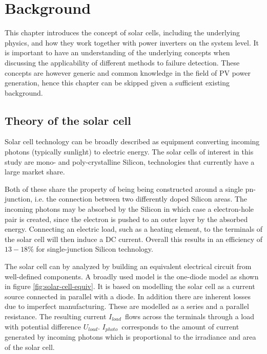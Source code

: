 \chapter{Background}
This chapter introduces the concept of solar cells, including the underlying physics,
and how they work together with power inverters on the system level.
It is important to have an understanding of the underlying concepts when discussing the applicability of different methods to failure detection.
These concepts are however generic and common knowledge in the field of PV power generation, 
hence this chapter can be skipped given a sufficient existing background.

\section{Theory of the solar cell}
Solar cell technology can be broadly described as equipment converting incoming photons (typically sunlight) to electric energy.
The solar cells of interest in this study are mono- and poly-crystalline Silicon, technologies that currently have a large market share\cite{Zhao2010thesis}.

Both of these share the property of being being constructed around a single pn-junction, i.e. the connection between two differently doped Silicon areas.
The incoming photons may be absorbed by the Silicon in which case a electron-hole pair is created\cite{Zhao2010thesis}, since the electron is pushed to an outer layer by the absorbed energy.
Connecting an electric load, such as a heating element, to the terminals of the solar cell will then induce a DC current.
Overall this results in an efficiency of $13-18\%$ for single-junction Silicon technology\cite{Zhao2010thesis}.

The solar cell can by analyzed by building an equivalent electrical circuit from well-defined components.
A broadly used model is the one-diode model\cite{Walker2001} as shown in figure \ref{fig:solar-cell-equiv}.
It is based on modelling the solar cell as a current source connected in parallel with a diode.
In addition there are inherent losses due to imperfect manufacturing.
These are modelled as a series and a parallel resistance.
The resulting current $I_{load}$ flows across the terminals through a load with potential difference $U_{load}$.
$I_{photo}$ corresponds to the amount of current generated by incoming photons which is proportional to the irradiance and area of the solar cell.

